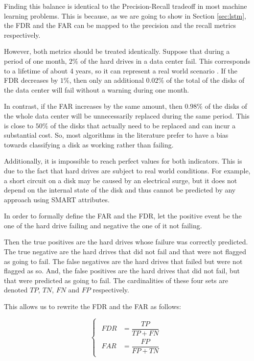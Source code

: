 Finding this balance is identical to the Precision-Recall tradeoff \cite{buckland1994relationship} in most machine learning problems.
This is because, as we are going to show in Section \ref{sec:lstm}, the FDR and the FAR can be mapped to the precision and the recall metrics respectively.

However, both metrics should be treated identically.
Suppose that during a period of one month, $2\%$ of the hard drives in a data center fail.
This corresponds to a lifetime of about 4 years, so it can represent a real world scenario \cite{Vishwanath10}.
If the FDR decreases by $1\%$, then only an additional $0.02\%$ of the total of the disks of the data center will fail without a warning during one month.

In contrast, if the FAR increases by the same amount, then $0.98\%$ of the disks of the whole data center will be unnecessarily replaced during the same period.
This is close to $50\%$ of the disks that actually need to be replaced and can incur a substantial cost.
So, most algorithms in the literature prefer to have a bias towards classifying a disk as working rather than failing.

Additionally, it is impossible to reach perfect values for both indicators.
This is due to the fact that hard drives are subject to real world conditions.
For example, a short circuit on a disk may be caused by an electrical surge, but it does not depend on the internal state of the disk and thus cannot be predicted by any approach using SMART attributes.

In order to formally define the FAR and the FDR, let the positive event be the one of the hard drive failing and negative the one of it not failing.

Then the true positives are the hard drives whose failure was correctly predicted.
The true negative are the hard drives that did not fail and that were not flagged as going to fail.
The false negatives are the hard drives that failed but were not flagged as so.
And, the false positives are the hard drives that did not fail, but that were predicted as going to fail.
The cardinalities of these four sets are denoted $TP$, $TN$, $FN$ and $FP$ respectively.

This allows us to rewrite the FDR and the FAR as follows:

\begin{equation}\label{eq:fdr_far}
    \begin{cases}
        \begin{aligned}
            FDR &= \dfrac{TP}{TP + FN} \\
            FAR &= \dfrac{FP}{FP + TN}
        \end{aligned}
    \end{cases}
\end{equation}

